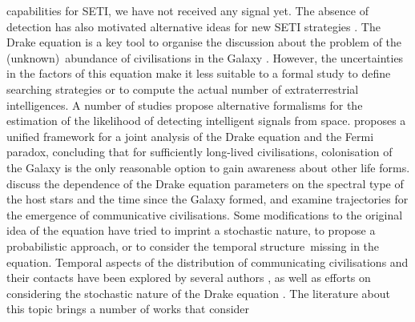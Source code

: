 \documentclass[crop]{CSLB}
\begin{document}
capabilities for SETI, we have not received any signal yet.
%
%
The absence of detection has also motivated alternative ideas for new
SETI strategies \citep{forgan_exoplanet_2017, balbi_impact_2018,
loeb_eavesdropping_2006, maccone_KLT_2010, tarter_advancing_2009,
enriquez_breakthrough_2017, loeb_relative_2016, maccone_SETI_2011,
lingam_relative_2019, wright_theGsearch_2015, maccone_SETI_2013,
maccone_lognormals_2014, harp_application_2018,
forgan_possibility_2013, forgan_galactic_2017, funes_searching_2019}.
%
\Fpagebreak
%
The Drake equation is a key tool to organise the discussion about the
problem of the (unknown) abundance of civilisations in the Galaxy
\citep{hinkel_interdisciplinary_2019}.
%
However, the uncertainties in the factors of this equation make it
less suitable to a formal study to define searching strategies or to
compute the actual number of extraterrestrial intelligences.
%
%
%
A number of studies propose alternative formalisms for the estimation of the
likelihood of detecting intelligent signals from space.
%
\citet{prantzos_joint_2013} proposes a unified framework for a joint
analysis of the Drake equation and the Fermi paradox, concluding that
for sufficiently long-lived civilisations, colonisation of the Galaxy
is the only reasonable option to gain awareness about other life
forms.
%
\citet{haqq-misra_drake_2017} discuss the dependence of the Drake
equation parameters on the spectral type of the host stars and the
time since the Galaxy formed, and examine trajectories for the
emergence of communicative civilisations.
%
Some modifications to the original idea of the equation have tried to
imprint a stochastic nature, to propose a probabilistic approach, or
to consider the temporal structure missing in the equation.
%
Temporal aspects of the distribution of communicating civilisations
and their contacts have been explored by several authors
\citep{fogg_temporal_1987, forgan_spatiotemporal_2011,
balbi_impact_2018, balb_spatiotemporal_2018, horvat_impact_2011}, as
well as efforts on considering the stochastic nature of the Drake
equation \citep{glade_stochastic_2011}.
%
The literature about this topic brings a number of works that consider
\end{document}
